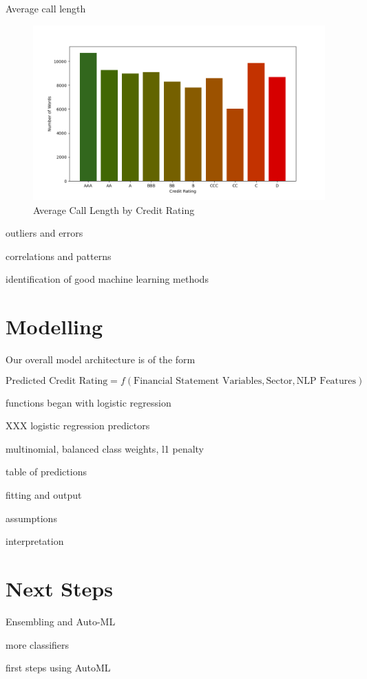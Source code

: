 \documentclass{article}
\begin{document}
    Average call length

    \begin{figure}[h!]
		\centering
        \caption{Average Call Length by Credit Rating}
        \includegraphics[width=0.5\linewidth,keepaspectratio=true]{../Output/All Data EDA/NLP EDA/all_data_call_length_by_credit_rating_no_title.png}
	\end{figure}

    outliers and errors

    correlations and patterns

    identification of good machine learning methods

    \section*{Modelling}

    Our overall model architecture is of the form

    \begin{equation*}
        \text{Predicted Credit Rating} = f(\text{Financial Statement Variables}, \text{Sector}, \text{NLP Features})
    \end{equation*}

    functions began with logistic regression

    XXX logistic regression predictors

    multinomial, balanced class weights, l1 penalty

    table of predictions

    fitting and output

    assumptions
    
    interpretation

    \section*{Next Steps}

    Ensembling and Auto-ML

    more classifiers
    
    first steps using AutoML
\end{document}
